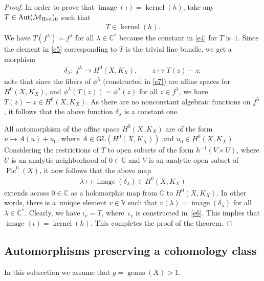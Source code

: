 \documentclass[pdftex]{sigma}
\numberwithin{equation}{section}
\begin{document}
\begin{proof}
In order to prove that $\operatorname{image}(\iota) = \operatorname{kernel}(h)$, take any $T \in \operatorname{Aut}({\mathcal M}_{\rm Hod})_0$ such that
\begin{gather*}T \in \operatorname{kernel}(h) .\end{gather*} We have $T(f^\lambda) = f^\lambda$ for all
$\lambda \in {\mathbb C}^*$ because the constant in \eqref{e4} for $T$ is~$1$. Since the element in \eqref{e5} corresponding to $T$ is the trivial line bundle, we get a morphism
\begin{gather*}
\delta_\lambda \colon \  f^\lambda \longrightarrow H^0(X, K_X) ,\qquad z \longmapsto T(z) - z ;
\end{gather*}
note that since the f\/ibers of $\phi^\lambda$ (constructed in \eqref{e7}) are af\/f\/ine spaces for $H^0(X, K_X)$, and $\phi^\lambda(T(z)) = \phi^\lambda(z)$ for all $z \in f^\lambda$, we have $T(z) - z \in H^0(X, K_X)$. As there are no nonconstant algebraic functions on $f^\lambda$ \cite[Proposition~2.2]{BBS}, it follows that the above function $\delta_\lambda$ is a constant one.

All automorphism of the af\/f\/ine space $H^0(X, K_X)$ are of the form $u \longmapsto A(u)+u_0$, where $A \in \text{GL}(H^0(X, K_X))$ and $u_0 \in H^0(X, K_X)$. Considering the restrictions of $T$ to open subsets of the form $h^{-1}(V\times U)$, where $U$ is an analytic neighborhood of $0 \in \mathbb C$ and $V$ is an analytic open subset of $\operatorname{Pic}^0(X)$, it now follows that the above map
\begin{gather*}\lambda \longmapsto \operatorname{image}(\delta_\lambda) \in H^0(X, K_X)\end{gather*}
extends across $0 \in \mathbb C$ as a holomorphic map from $\mathbb C$ to $H^0(X, K_X)$. In other words, there is a~unique element $v \in {\mathbb V}$ such that $v(\lambda) = \operatorname{image} (\delta_\lambda)$ for all $\lambda \in {\mathbb C}^*$. Clearly, we have $\iota_v = T$, where~$\iota_v$ is constructed in~\eqref{e6}. This implies that $\operatorname{image}(\iota) = \operatorname{kernel}(h)$. This completes the proof of the theorem.
\end{proof}

\subsection{Automorphisms preserving a cohomology class}\label{Autocoh}

In this subsection we assume that $g = \operatorname{genus}(X) > 1$.
\end{document}
